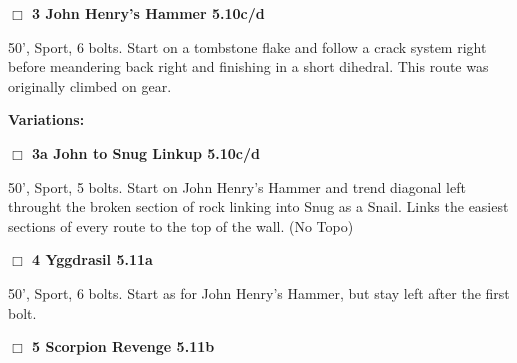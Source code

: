 	\begin{multicols}{2}


\needspace{2em}
\label{rt:John Henry's Hammer}
\colorbox{RoyalBlue!20}{
\parbox{0.95\linewidth}{
\hspace{-1ex}\textbf{$\Box$
3 John Henry's Hammer 5.10c/d  
}}}
\begin{adjustwidth}{1.3em}{}			

50', Sport, 6 bolts. Start on a tombstone flake and follow a crack system right before meandering back right and finishing in a short dihedral. This route was originally climbed on gear.
\end{adjustwidth}


\begin{adjustwidth}{0.5cm}{}				
\needspace{4em}
\textbf{Variations:} \newline

\needspace{2em}
\label{vr:John to Snug Linkup}
\colorbox{RoyalBlue!20}{
\parbox{0.95\linewidth}{
\hspace{-1ex}\textbf{$\Box$
3a John to Snug Linkup 5.10c/d  
}}}
\begin{adjustwidth}{1.3em}{}			

50', Sport, 5 bolts. Start on John Henry's Hammer and trend diagonal left throught the broken section of rock linking into Snug as a Snail. Links the easiest sections of every route to the top of the wall.
  (No Topo)
\end{adjustwidth}



\end{adjustwidth}


\needspace{2em}
\label{rt:Yggdrasil}
\colorbox{RoyalBlue!20}{
\parbox{0.95\linewidth}{
\hspace{-1ex}\textbf{$\Box$
4 Yggdrasil 5.11a  
}}}
\begin{adjustwidth}{1.3em}{}			

50', Sport, 6 bolts. Start as for John Henry's Hammer, but stay left after the first bolt.
\end{adjustwidth}




\needspace{2em}
\label{rt:Scorpion Revenge}
\colorbox{RoyalBlue!20}{
\parbox{0.95\linewidth}{
\hspace{-1ex}\textbf{$\Box$
5 Scorpion Revenge 5.11b  
}}}
\begin{adjustwidth}{1.3em}{}			


\end{adjustwidth}
\end{multicols}
